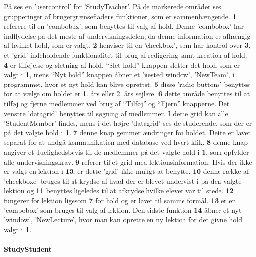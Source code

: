 På  ses en 'usercontrol' for 'StudyTeacher'. På de markerede områder ses grupperinger af brugergrænsefladens funktioner, som er sammenhængende.
\textbf{1} referere til en 'combobox', som benyttes til valg af hold. 
Denne 'combobox' har indflydelse på det meste af undervisningsdelen, da denne information er afhængig af hvilket hold, som er valgt.
\textbf{2} henviser til en 'checkbox', som har kontrol over \textbf{3}, et 'grid' indeholdende funktionalitet til brug af redigering samt kreation af hold.
\textbf{4} er tilføjelse og sletning af hold, ``Slet hold'' knappen sletter det hold, som er valgt i \textbf{1}, mens ``Nyt hold'' knappen åbner et 'nested window', 'NewTeam', i programmet, hvor et nyt hold kan blive oprettet.
\textbf{5} disse 'radio buttons' benyttes for at vælge om holdet er 1. års eller 2. års sejlere.
\textbf{6} dette område benyttes til at tilføj og fjerne medlemmer ved brug af ``Tilføj'' og ``Fjern'' knapperne. 
Det venstre 'datagrid' benyttes til søgning af medlemmer. I dette grid kan alle 'StudentMember' findes, mens i det højre 'datagrid' ses de studerende, som der er på det valgte hold i \textbf{1}.
\textbf{7} denne knap gemmer ændringer for holdet. Dette er lavet separat for at undgå kommunikation med database ved hvert klik.
\textbf{8} denne knap angiver et duelighedsbevis til de medlemmer på det valgte hold i \textbf{1}, som opfylder alle undervisningskrav.
\textbf{9} referer til et grid med lektionsinformation. Hvis der ikke er valgt en lektion i \textbf{13}, er dette 'grid' ikke muligt at benytte.
\textbf{10} denne række af 'checkboxe' bruges til at krydse af hvad der er blevet undervist i på den valgte lektion og \textbf{11} benyttes ligeledes til at afkrydse hvilke elever var til stede.
\textbf{12} fungerer for lektion ligesom \textbf{7} for hold og er lavet til samme formål.
\textbf{13} er en 'combobox' som bruges til valg af lektion.
Den sidste funktion \textbf{14} åbner et nyt 'window', 'NewLecture', hvor man kan oprette en ny lektion for det givne hold valgt i \textbf{1}.

\paragraph{StudyStudent}

